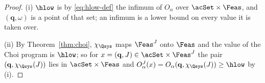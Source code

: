 \begin{proof}
(i) $\hlow$ is by \eqref{eq:hlow-def} the infimum of $O_{\alpha}$ over
$\acSet\times\Feas$, and $(\mathbf q,\omega)$ is a point of that set; an
infimum is a lower bound on every value it is taken over.

(ii) By Theorem~\ref{thm:choi}, $\chi_{\Qsys}$ maps $\Feas^{J}$ onto
$\Feas$ and the value of the Choi program is $\hlow$; so for
$x=(\mathbf q,J)\in\acSet\times\Feas^{J}$ the pair
$(\mathbf q,\chi_{\Qsys}(J))$ lies in $\acSet\times\Feas$ and
$O^{J}_{\alpha}(x)=O_{\alpha}(\mathbf q,\chi_{\Qsys}(J))\ge\hlow$ by (i).
\end{proof}
